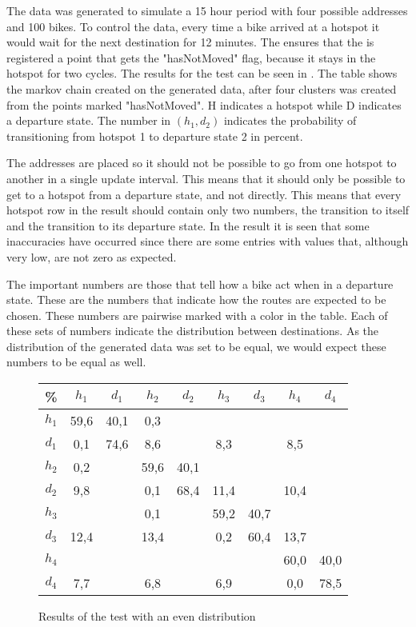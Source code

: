 The data was generated to simulate a 15 hour period with four possible addresses and 100 bikes.
To control the data, every time a bike arrived at a hotspot it would wait for the next destination for 12 minutes.
The ensures that the is registered a point that gets the "hasNotMoved" flag, because it stays in the hotspot for two cycles.
The results for the test can be seen in .
The table shows the markov chain created on the generated data, after four clusters was created from the points marked "hasNotMoved".
H indicates a hotspot while D indicates a departure state.
The number in $ (h_1,d_2) $ indicates the probability of transitioning from hotspot 1 to departure state 2 in percent. 

The addresses are placed so it should not be possible to go from one hotspot to another in a single update interval.
This means that it should only be possible to get to a hotspot from a departure state, and not directly.
This means that every hotspot row in the result should contain only two numbers, the transition to itself and the transition to its departure state.
In the result it is seen that some inaccuracies have occurred since there are some entries with values that, although very low, are not zero as expected.

The important numbers are those that tell how a bike act when in a departure state.
These are the numbers that indicate how the routes are expected to be chosen.
These numbers are pairwise marked with a color in the table.
Each of these sets of numbers indicate the distribution between destinations.
As the distribution of the generated data was set to be equal, we would expect these numbers to be equal as well.

\begin{figure}
	\centering
\begin{tabular}{|c | c c c c c c c c|}
\hline
\% &      $ h_1 $ & $ d_1 $ & $ h_2 $ & $ d_2 $ & $ h_3 $ & $ d_3 $ & $ h_4 $ & $ d_4 $\\
 \hline
$ h_1 $ & 59,6 &  40,1 & 0,3 &   &   &   &   &  \\
$ d_1 $ & 0,1 &  74,6 &  { \color{red} 8,6} &   &   {\color{red}8,3} &   &  {\color{red} 8,5} &  \\
$ h_2 $ & 0,2 &   &  59,6 &  40,1 &   &   &   &  \\
$ d_2 $ & {\color{blue}9,8} &   &   0,1 &  68,4 &  {\color{blue}11,4} &   &  {\color{blue}10,4} &  \\
$ h_3 $ & &   &   0,1 &   &  59,2 &  40,7 &   &  \\
$ d_3 $ & {\color{orange}12,4} &   &  {\color{orange}13,4} &   &   0,2 &  60,4 &  {\color{orange}13,7} &  \\
$ h_4 $ & &   &   &   &   &   &  60,0 &  40,0\\
$ d_4 $ & {\color{purple}7,7} &   &   {\color{purple}6,8} &   &   {\color{purple}6,9} &   &   0,0 &  78,5\\
\hline
\end{tabular}
\caption{Results of the test with an even distribution}\label{test_even}
\end{figure}

